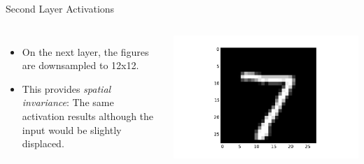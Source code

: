 \documentclass[10pt, aspectratio=169]{beamer} %
\begin{document}
\begin{frame}[fragile]{Second Layer Activations}
\begin{columns}
\begin{itemize}
	\item On the next layer, the figures are downsampled to 12x12.
	\item This provides \emph{spatial invariance}: The same activation results although the input would be slightly displaced.
	\end{itemize}
\includegraphics[width=\textwidth]{keras_l1_input.pdf}\\

\end{columns}
\end{frame}
\end{document}
